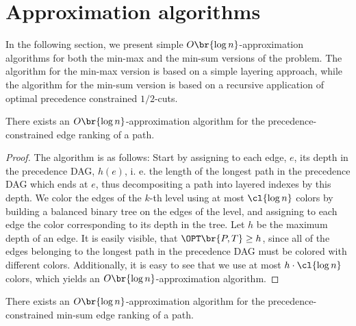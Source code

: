 \section{Approximation algorithms}

In the following section, we present simple $O\br{\log n}$-approximation algorithms for both the min-max and the min-sum versions of the problem. The algorithm for the min-max version is based on a simple layering approach, while the algorithm for the min-sum version is based on a recursive application of optimal precedence constrained $1/2$-cuts.

\label{sec:approximation}
\begin{theorem}
There exists an $O\br{\log n}$-approximation algorithm for the precedence-constrained edge ranking of a path.
\end{theorem}
\begin{proof}
    The algorithm is as follows: Start by assigning to each edge, $e$, its depth in the precedence DAG, $h(e)$, i. e. the length of the longest path in the precedence DAG which ends at $e$, thus decompositing a path into layered indexes by this depth. We color the edges of the $k$-th level using at most $\cl{\log n}$ colors by building a balanced binary tree on the edges of the level, and assigning to each edge the color corresponding to its depth in the tree. Let $h$ be the maximum depth of an edge. It is easily visible, that $\OPT\br{P, T}\geq h$, since all of the edges belonging to the longest path in the precedence DAG must be colored with different colors. Additionally, it is easy to see that we use at most $h\cdot\cl{\log n}$ colors, which yields an $O\br{\log n}$-approximation algorithm.
\end{proof}
\begin{theorem}
There exists an $O\br{\log n}$-approximation algorithm for the precedence-constrained min-sum edge ranking of a path.
\end{theorem}
